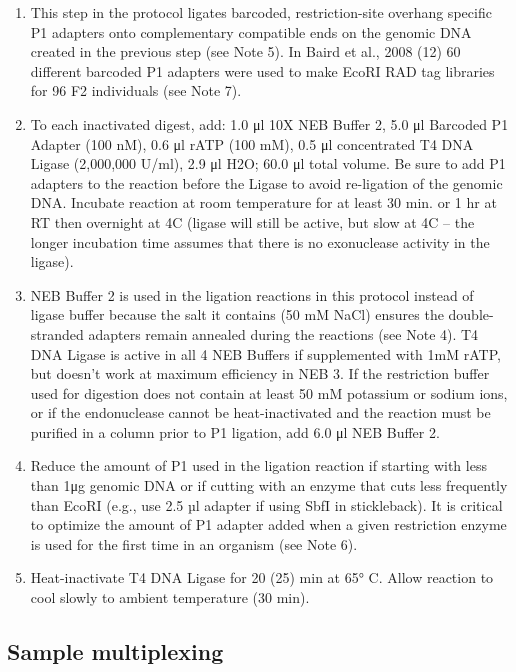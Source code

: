 \documentclass[
  letterpaper,
  DIV=11,
  numbers=noendperiod]{scrreprt}
\providecommand{\tightlist}{%
  \setlength{\itemsep}{0pt}\setlength{\parskip}{0pt}}\usepackage{longtable,booktabs,array}
\begin{document}
\begin{enumerate}
\def\labelenumi{\arabic{enumi}.}
\tightlist
\item
  This step in the protocol ligates barcoded, restriction-site overhang
  specific P1 adapters onto complementary compatible ends on the genomic
  DNA created in the previous step (see Note 5). In Baird et al., 2008
  (12) 60 different barcoded P1 adapters were used to make EcoRI RAD tag
  libraries for 96 F2 individuals (see Note 7).
\item
  To each inactivated digest, add: 1.0 μl 10X NEB Buffer 2, 5.0 μl
  Barcoded P1 Adapter (100 nM), 0.6 μl rATP (100 mM), 0.5 μl
  concentrated T4 DNA Ligase (2,000,000 U/ml), 2.9 μl H2O; 60.0 μl total
  volume. Be sure to add P1 adapters to the reaction before the Ligase
  to avoid re-ligation of the genomic DNA. Incubate reaction at room
  temperature for at least 30 min. or 1 hr at RT then overnight at 4C
  (ligase will still be active, but slow at 4C -- the longer incubation
  time assumes that there is no exonuclease activity in the ligase).
\item
  NEB Buffer 2 is used in the ligation reactions in this protocol
  instead of ligase buffer because the salt it contains (50 mM NaCl)
  ensures the double-stranded adapters remain annealed during the
  reactions (see Note 4). T4 DNA Ligase is active in all 4 NEB Buffers
  if supplemented with 1mM rATP, but doesn't work at maximum efficiency
  in NEB 3. If the restriction buffer used for digestion does not
  contain at least 50 mM potassium or sodium ions, or if the
  endonuclease cannot be heat-inactivated and the reaction must be
  purified in a column prior to P1 ligation, add 6.0 μl NEB Buffer 2.
\item
  Reduce the amount of P1 used in the ligation reaction if starting with
  less than 1μg genomic DNA or if cutting with an enzyme that cuts less
  frequently than EcoRI (e.g., use 2.5 µl adapter if using SbfI in
  stickleback). It is critical to optimize the amount of P1 adapter
  added when a given restriction enzyme is used for the first time in an
  organism (see Note 6).
\item
  Heat-inactivate T4 DNA Ligase for 20 (25) min at 65° C. Allow reaction
  to cool slowly to ambient temperature (30 min).
\end{enumerate}

\hypertarget{sample-multiplexing}{%
\subsection{Sample multiplexing}\label{sample-multiplexing}}
\end{document}
